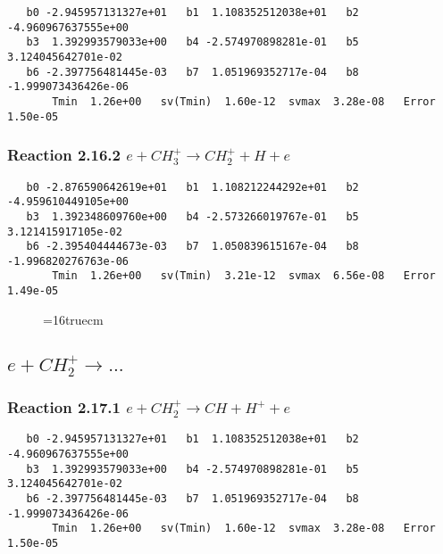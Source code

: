 \documentclass[12pt]{article}
\begin{document}
\begin{small}\begin{verbatim} 
   b0 -2.945957131327e+01   b1  1.108352512038e+01   b2 -4.960967637555e+00
   b3  1.392993579033e+00   b4 -2.574970898281e-01   b5  3.124045642701e-02
   b6 -2.397756481445e-03   b7  1.051969352717e-04   b8 -1.999073436426e-06
       Tmin  1.26e+00   sv(Tmin)  1.60e-12  svmax  3.28e-08   Error  1.50e-05
\end{verbatim}\end{small}

\subsubsection{
Reaction 2.16.2   $e + CH_3^+ \rightarrow CH_2^+ + H + e$
}

\begin{small}\begin{verbatim}
   b0 -2.876590642619e+01   b1  1.108212244292e+01   b2 -4.959610449105e+00
   b3  1.392348609760e+00   b4 -2.573266019767e-01   b5  3.121415917105e-02
   b6 -2.395404444673e-03   b7  1.050839615167e-04   b8 -1.996820276763e-06
       Tmin  1.26e+00   sv(Tmin)  3.21e-12  svmax  6.56e-08   Error  1.49e-05
\end{verbatim}\end{small}
 
\begin{figure} \label{met.2_2.16}
\epsfxsize=16truecm
\end{figure}
\newpage
 
\subsection{ 
$e + CH_2^+ \rightarrow ... $
}
 
\subsubsection{
Reaction 2.17.1   $e + CH_2^+ \rightarrow CH + H^+ + e$
}

\begin{small}\begin{verbatim} 
   b0 -2.945957131327e+01   b1  1.108352512038e+01   b2 -4.960967637555e+00
   b3  1.392993579033e+00   b4 -2.574970898281e-01   b5  3.124045642701e-02
   b6 -2.397756481445e-03   b7  1.051969352717e-04   b8 -1.999073436426e-06
       Tmin  1.26e+00   sv(Tmin)  1.60e-12  svmax  3.28e-08   Error  1.50e-05
\end{verbatim}\end{small}
\end{document}
